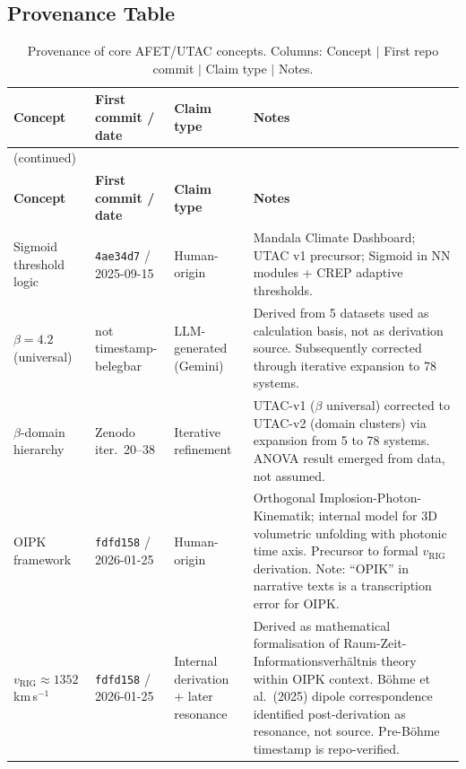 \documentclass[12pt,a4paper]{article}
\theoremstyle{definition}
\newcommand{\vrig}{v_{\mathrm{RIG}}}
\begin{document}
\subsection*{Provenance Table}

\begin{longtable}{p{2.8cm}p{2.2cm}p{2.2cm}p{5.2cm}}
\caption{Provenance of core AFET/UTAC concepts.
Columns: Concept $|$ First repo commit $|$ Claim type $|$ Notes.}
\label{tab:provenance}\\
\toprule
\textbf{Concept} & \textbf{First commit / date} & \textbf{Claim type} & \textbf{Notes} \\
\midrule
\endfirsthead
\multicolumn{4}{l}{\small(continued)}\\
\toprule
\textbf{Concept} & \textbf{First commit / date} & \textbf{Claim type} & \textbf{Notes} \\
\midrule
\endhead
Sigmoid threshold logic & \texttt{4ae34d7} / 2025-09-15 & Human-origin & Mandala Climate Dashboard;
  UTAC v1 precursor; Sigmoid in NN modules + CREP adaptive thresholds. \\[4pt]

$\beta = 4.2$ (universal) & not timestamp-belegbar & LLM-generated (Gemini) &
  Derived from 5 datasets used as calculation basis, not as derivation source.
  Subsequently corrected through iterative expansion to 78 systems. \\[4pt]

$\beta$-domain hierarchy & Zenodo iter.\ 20--38 & Iterative refinement &
  UTAC-v1 ($\beta$ universal) corrected to UTAC-v2 (domain clusters)
  via expansion from 5 to 78 systems. ANOVA result emerged from data,
  not assumed. \\[4pt]

OIPK framework & \texttt{fdfd158} / 2026-01-25 & Human-origin &
  Orthogonal Implosion-Photon-Kinematik; internal model for 3D volumetric
  unfolding with photonic time axis. Precursor to formal $\vrig$ derivation.
  Note: ``OPIK'' in narrative texts is a transcription error for OIPK. \\[4pt]

$\vrig \approx 1352$\,km\,s$^{-1}$ & \texttt{fdfd158} / 2026-01-25 &
  Internal derivation + later resonance &
  Derived as mathematical formalisation of Raum-Zeit-Informationsverhältnis
  theory within OIPK context. Böhme et al.\ (2025) dipole correspondence
  identified post-derivation as resonance, not source.
  Pre-Böhme timestamp is repo-verified. \\[4pt]


\end{longtable}
\end{document}
